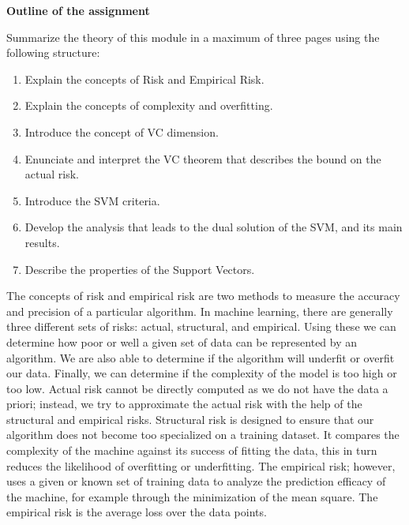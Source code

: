 \documentclass[11pt]{article}
\begin{document}
\textbf{Outline of the assignment}

Summarize the theory of this module in a maximum of three pages using the following structure:
\begin{enumerate}
    \item Explain the concepts of Risk and Empirical Risk.
    \item Explain the concepts of complexity and overfitting.
    \item Introduce the concept of VC dimension.
    \item Enunciate and interpret the VC theorem that describes the bound on the actual risk.
    \item Introduce the SVM criteria.
    \item Develop the analysis that leads to the dual solution of the SVM, and its main results.
    \item Describe the properties of the Support Vectors.
\end{enumerate}

\begin{tcolorbox}[colback=CrispBlue!5!white,colframe=CrispBlue!75!black,title=1. Explain the concepts of Risk and Empirical Risk.]
The concepts of risk and empirical risk are two methods to measure the accuracy and precision of a particular algorithm. In machine learning, there are generally three different sets of risks: actual, structural, and empirical. Using these we can determine how poor or well a given set of data can be represented by an algorithm. We are also able to determine if the algorithm will underfit or overfit our data. Finally, we can determine if the complexity of the model is too high or too low. Actual risk cannot be directly computed as we do not have the data a priori; instead, we try to approximate the actual risk with the help of the structural and empirical risks. Structural risk is designed to ensure that our algorithm does not become too specialized on a training dataset. It compares the complexity of the machine against its success of fitting the data, this in turn reduces the likelihood of overfitting or underfitting. The empirical risk; however, uses a given or known set of training data to analyze the prediction efficacy of the machine, for example through the minimization of the mean square. The empirical risk is the average loss over the data points.
\end{tcolorbox}
\end{document}
